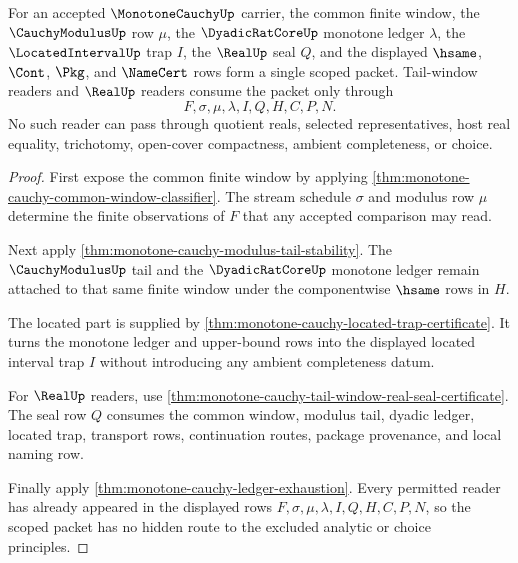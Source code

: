 \begin{theorem}
\label{thm:monotone-cauchy-scoped-tail-window-package}
For an accepted $\MonotoneCauchyUp$ carrier, the common finite window, the $\CauchyModulusUp$ row $\mu$, the $\DyadicRatCoreUp$ monotone ledger $\lambda$, the $\LocatedIntervalUp$ trap $I$, the $\RealUp$ seal $Q$, and the displayed $\hsame$, $\Cont$, $\Pkg$, and $\NameCert$ rows form a single scoped packet. Tail-window readers and $\RealUp$ readers consume the packet only through
$$
F,\sigma,\mu,\lambda,I,Q,H,C,P,N.
$$
No such reader can pass through quotient reals, selected representatives, host real equality, trichotomy, open-cover compactness, ambient completeness, or choice.
\end{theorem}
\begin{proof}
First expose the common finite window by applying \autoref{thm:monotone-cauchy-common-window-classifier}. The stream schedule $\sigma$ and modulus row $\mu$ determine the finite observations of $F$ that any accepted comparison may read.

Next apply \autoref{thm:monotone-cauchy-modulus-tail-stability}. The $\CauchyModulusUp$ tail and the $\DyadicRatCoreUp$ monotone ledger remain attached to that same finite window under the componentwise $\hsame$ rows in $H$.

The located part is supplied by \autoref{thm:monotone-cauchy-located-trap-certificate}. It turns the monotone ledger and upper-bound rows into the displayed located interval trap $I$ without introducing any ambient completeness datum.

For $\RealUp$ readers, use \autoref{thm:monotone-cauchy-tail-window-real-seal-certificate}. The seal row $Q$ consumes the common window, modulus tail, dyadic ledger, located trap, transport rows, continuation routes, package provenance, and local naming row.

Finally apply \autoref{thm:monotone-cauchy-ledger-exhaustion}. Every permitted reader has already appeared in the displayed rows $F,\sigma,\mu,\lambda,I,Q,H,C,P,N$, so the scoped packet has no hidden route to the excluded analytic or choice principles.
\end{proof}

